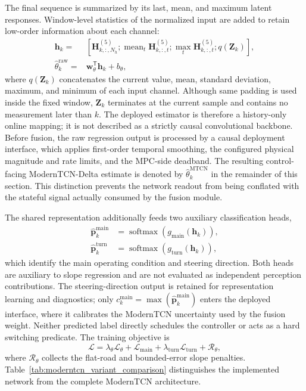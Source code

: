 \documentclass{ieeeaccess}
\begin{document}
The final sequence is summarized by its last, mean, and maximum latent responses. Window-level statistics of the normalized input are added to retain low-order information about each channel:
\begin{equation}
\begin{aligned}
\mathbf h_k={}&\left[
\mathbf H_{k,:,N_h}^{(5)};
\operatorname{mean}_{t}\mathbf H_{k,:,t}^{(5)};
\operatorname{max}_{t}\mathbf H_{k,:,t}^{(5)};
q(\mathbf Z_k)\right],\\
\hat{\theta}^{\mathrm{raw}}_k
 ={}&\mathbf w_{\theta}^{\mathsf T}\mathbf h_k+b_{\theta},
\end{aligned}
\label{eq:moderntcn_readout}
\end{equation}
where $q(\mathbf Z_k)$ concatenates the current value, mean, standard deviation, maximum, and minimum of each input channel. Although same padding is used inside the fixed window, $\mathbf Z_k$ terminates at the current sample and contains no measurement later than $k$. The deployed estimator is therefore a history-only online mapping; it is not described as a strictly causal convolutional backbone. Before fusion, the raw regression output is processed by a causal deployment interface, which applies first-order temporal smoothing, the configured physical magnitude and rate limits, and the MPC-side deadband. The resulting control-facing ModernTCN-Delta estimate is denoted by $\hat{\theta}^{\mathrm{MTCN}}_k$ in the remainder of this section. This distinction prevents the network readout from being conflated with the stateful signal actually consumed by the fusion module.

The shared representation additionally feeds two auxiliary classification heads,
\begin{equation}
\begin{aligned}
\hat{\mathbf p}^{\mathrm{main}}_k
&=\operatorname{softmax}\!\left(g_{\mathrm{main}}(\mathbf h_k)\right),\\
\hat{\mathbf p}^{\mathrm{turn}}_k
&=\operatorname{softmax}\!\left(g_{\mathrm{turn}}(\mathbf h_k)\right),
\end{aligned}
\label{eq:slope_auxiliary_outputs}
\end{equation}
which identify the main operating condition and steering direction. Both heads are auxiliary to slope regression and are not evaluated as independent perception contributions. The steering-direction output is retained for representation learning and diagnostics; only $c_k^{\mathrm{main}}=\max(\hat{\mathbf p}^{\mathrm{main}}_k)$ enters the deployed interface, where it calibrates the ModernTCN uncertainty used by the fusion weight. Neither predicted label directly schedules the controller or acts as a hard switching predicate. The training objective is
\begin{equation}
\mathcal L=
\lambda_{\theta}\mathcal L_{\theta}
+\mathcal L_{\mathrm{main}}
+\lambda_{\mathrm{turn}}\mathcal L_{\mathrm{turn}}
+\mathcal R_{\theta},
\label{eq:slope_estimator_loss}
\end{equation}
where $\mathcal R_{\theta}$ collects the flat-road and bounded-error slope penalties. Table~\ref{tab:moderntcn_variant_comparison} distinguishes the implemented network from the complete ModernTCN architecture.
\end{document}
